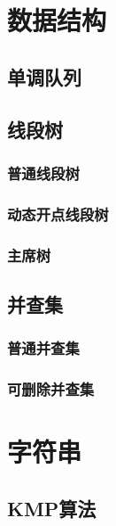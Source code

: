\documentclass[UTF8]{article}
\newcommand{\cppcode}[1]{
    
}
\begin{document}
\newpage

\section{数据结构}

\subsection{单调队列}
\cppcode{queue.cpp}

\subsection{线段树}

\subsubsection{普通线段树}
\cppcode{sgt.cpp}

\subsubsection{动态开点线段树}
\cppcode{sgt2.cpp}

\subsubsection{主席树}
\cppcode{主席树.cpp}

\subsection{并查集}

\subsubsection{普通并查集}
\cppcode{dsu.cpp}

\subsubsection{可删除并查集}
\cppcode{dsu(delete).cpp}

\newpage

\section{字符串}

\subsection{KMP算法}
\cppcode{kmp.cpp}
\end{document}
